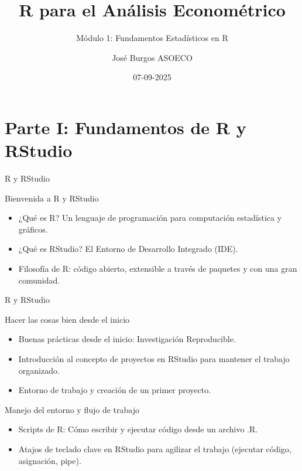 \documentclass[
  ignorenonframetext,
]{beamer}
\title{R para el Análisis Econométrico}
\subtitle{Módulo 1: Fundamentos Estadísticos en R}
\author{José Burgos \textbar{} ASOECO}
\date{07-09-2025}
\providecommand{\tightlist}{%
  \setlength{\itemsep}{0pt}\setlength{\parskip}{0pt}}
\begin{document}
\frame{\titlepage}

\section{Parte I: Fundamentos de R y
RStudio}\label{parte-i-fundamentos-de-r-y-rstudio}

\begin{frame}{R y RStudio}
\label{r-y-rstudio}
\begin{block}{Bienvenida a R y RStudio}
\label{bienvenida-a-r-y-rstudio}
\begin{itemize}
\tightlist
\item
  ¿Qué es R? Un lenguaje de programación para computación estadística y
  gráficos.
\end{itemize}

\begin{itemize}
\item
  ¿Qué es RStudio? El Entorno de Desarrollo Integrado (IDE).
\item
  Filosofía de R: código abierto, extensible a través de paquetes y con
  una gran comunidad.
\end{itemize}
\end{block}
\end{frame}

\begin{frame}{R y RStudio}
\label{r-y-rstudio-1}
\begin{block}{Hacer las cosas bien desde el inicio}
\label{hacer-las-cosas-bien-desde-el-inicio}
\begin{itemize}
\item
  Buenas prácticas desde el inicio: Investigación Reproducible.
\item
  Introducción al concepto de proyectos en RStudio para mantener el
  trabajo organizado.
\item
  Entorno de trabajo y creación de un primer proyecto.
\end{itemize}
\end{block}

\begin{block}{Manejo del entorno y flujo de trabajo}
\label{manejo-del-entorno-y-flujo-de-trabajo}
\begin{itemize}
\tightlist
\item
  Scripts de R: Cómo escribir y ejecutar código desde un archivo .R.
\item
  Atajos de teclado clave en RStudio para agilizar el trabajo (ejecutar
  código, asignación, pipe).
\end{itemize}
\end{block}
\end{frame}
\end{document}

